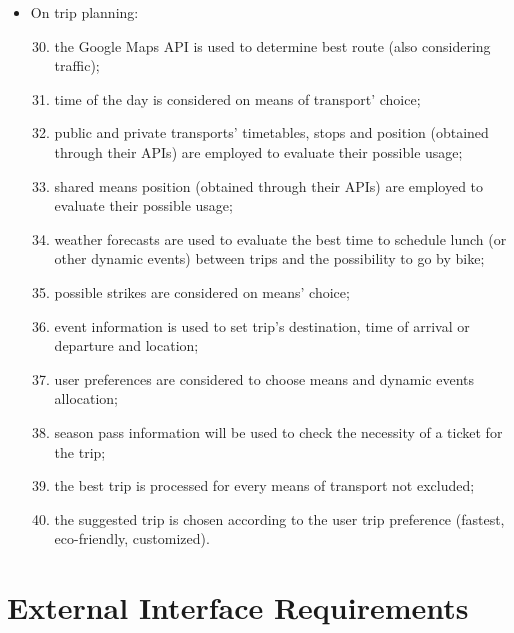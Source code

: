 \begin{itemize}
\item	On trip planning:
\begin{enumerate}
  \setcounter{enumi}{29}
\item	the Google Maps API is used to determine best route (also considering traffic);
\item	time of the day is considered on means of transport’ choice;
\item	public and private transports’ timetables, stops and position (obtained through their APIs) are employed to evaluate their possible usage;
\item	shared means position (obtained through their APIs) are employed to evaluate their possible usage;
\item	weather forecasts are used to evaluate the best time to schedule lunch (or other dynamic events) between trips and the possibility to go by bike;
\item	possible strikes are considered on means’ choice;
\item	event information is used to set trip’s destination, time of arrival or departure and location;
\item	user preferences are considered to choose means and dynamic events allocation;
\item	season pass information will be used to check the necessity of a ticket for the trip;
\item	the best trip is processed for every means of transport not excluded;
\item	the suggested trip is chosen according to the user trip preference (fastest, eco-friendly, customized).
\end{enumerate}
\end{itemize}
%
%
\section{External Interface Requirements}
